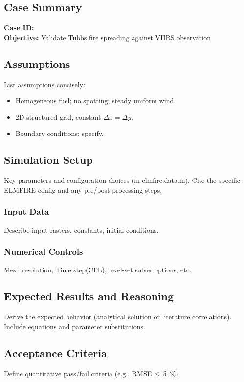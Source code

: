 \documentclass[../report/case_report.tex]{subfiles}
\begin{document}
\subsection*{Case Summary}
\textbf{Case ID:} \CaseID\\
\textbf{Objective:} Validate Tubbs fire spreading against VIIRS observation


\subsection{Assumptions}
List assumptions concisely:
\begin{itemize}[nosep]
\item Homogeneous fuel; no spotting; steady uniform wind.
\item 2D structured grid, constant \(\Delta x = \Delta y\).
\item Boundary conditions: specify.
\end{itemize}


\subsection{Simulation Setup}
Key parameters and configuration choices (in elmfire.data.in). Cite the specific ELMFIRE config and any pre/post processing steps.


\subsubsection{Input Data}
Describe input rasters, constants, initial conditions.


\subsubsection{Numerical Controls}
Mesh resolution, Time step(CFL), level-set solver options, etc.


\subsection{Expected Results and Reasoning}
Derive the expected behavior (analytical solution or literature correlations). Include equations and parameter substitutions.


\subsection{Acceptance Criteria}
Define quantitative pass/fail criteria (e.g., RMSE\,\(\leq\)\,\SI{5}{\percent}).
\end{document}
